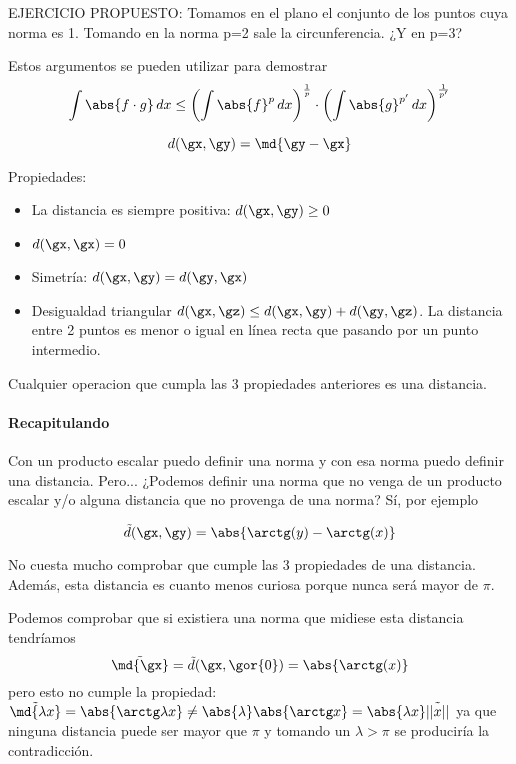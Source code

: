 \documentclass{apuntes}
\begin{document}
EJERCICIO PROPUESTO: Tomamos en el plano el conjunto de los puntos cuya norma es 1. Tomando en la norma p=2 sale la circunferencia. ¿Y en p=3? 


\begin{remark} Estos argumentos se pueden utilizar para demostrar
\[ \int \abs{f\cdot g}\, dx \leq \left(\int\abs{f}^p\, dx\right) ^ \frac{1}{p} \cdot \left(\int\abs{g}^{p'}\,dx\right)^\frac{1}{p'} \]
\end{remark}

\newpage


\begin{defn}
\[d(\gx,\gy) = \md{\gy - \gx} \]
\end{defn}

Propiedades:
\begin{itemize}
 \item La distancia es siempre positiva: $d(\gx,\gy)\ge 0$
 \item $d(\gx,\gx) = 0$
 \item Simetría: $d(\gx,\gy) = d(\gy, \gx)$
 \item Desigualdad triangular $d(\gx,\gz) \leq d(\gx,\gy) + d(\gy,\gz)$. La distancia entre 2 puntos es menor o igual en línea recta que pasando por un punto intermedio.
\end{itemize}


\begin{defn}[Distancia] Cualquier operacion que cumpla las 3 propiedades anteriores es una distancia. \end{defn}

\paragraph{Recapitulando}
Con un producto escalar puedo definir una norma y con esa norma puedo definir una distancia. Pero... ¿Podemos definir una norma 
que no venga de un producto escalar y/o alguna distancia que no provenga de una norma? Sí, por ejemplo

\[ \tilde{d} (\gx,\gy) = \abs{\arctg(y) - \arctg(x)} \] 

No cuesta mucho comprobar que cumple las 3 propiedades de una distancia. Además, esta distancia es cuanto menos curiosa porque nunca será mayor de $\pi$.

 Podemos comprobar que si existiera una norma que midiese esta distancia tendríamos \[\tilde{\md{\gx}} = \tilde{d} (\gx,\gor{0}) = \abs{\arctg (x)} \]
 pero esto no cumple la propiedad: $\tilde{\md{\lambda x}} = \abs{\arctg \lambda x} \neq \abs{\lambda}\abs{\arctg x} = 
 \abs{\lambda x}\tilde{||x||}$
 ya que ninguna distancia puede ser mayor que $\pi$ y tomando un $\lambda > \pi$ se produciría la contradicción.
\end{document}
